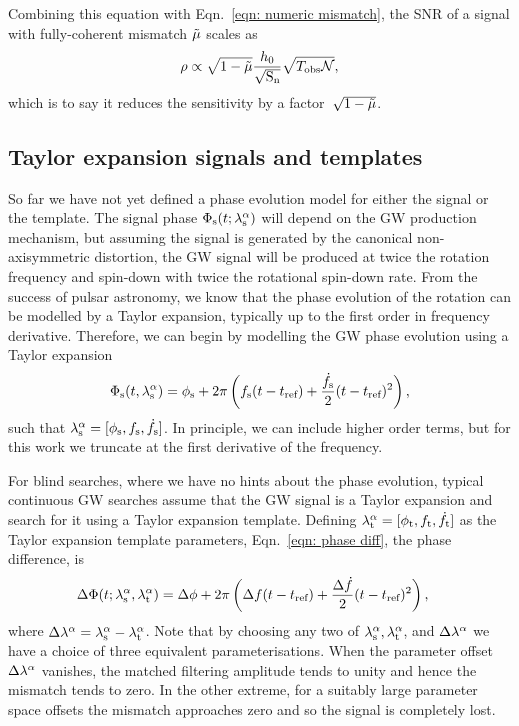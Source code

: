 \documentclass[../full_thesis/full_thesis.tex]{subfiles}
\begin{document}
Combining this equation with Eqn.~\eqref{eqn: numeric mismatch}, the SNR of a signal
with fully-coherent mismatch $\tilde{\mu}$ scales as
\begin{equation}
\rho \propto \sqrt{1-\tilde{\mu}} \frac{h_{0}}{\sqrt{\textrm{S}_{\textrm{n}}}}
                               \sqrt{T_{\mathrm{obs}} \mathcal{N}},
\end{equation}
which is to say it reduces the sensitivity by a factor~$\sqrt{1-\tilde{\mu}}$.



\subsection{Taylor expansion signals and templates}
So far we have not yet defined a phase evolution model for either the signal or the template.
The signal phase $\Phi_{\textrm{s}}(t; {\lambda}_\textrm{s}^{\alpha})$ will depend on the GW production mechanism,
but assuming the signal is generated by the canonical non-axisymmetric distortion,
the GW signal will be produced at twice the rotation frequency and spin-down
with twice the rotational spin-down rate. From the success of pulsar astronomy,
we know that the phase evolution of the rotation can be modelled by a Taylor
expansion, typically up to the first order in frequency derivative. Therefore,
we can begin by modelling the GW phase evolution using a Taylor expansion
\begin{equation}
\Phi_{\textrm{s}} (t, {\lambda}_\textrm{s}^{\alpha}) = \phi_{\textrm{s}} + 2\pi \left(f_{\textrm{s}} (t - t_{\textrm{ref}})
+ \frac{\dot{f}_{\textrm{s}}}{2}(t - t_{\textrm{ref}})^{2} \right),
\label{eqn: Taylor lambda signal}
\end{equation}
such that ${\lambda}_\textrm{s}^{\alpha} = [\phi_{\textrm{s}}, f_{\textrm{s}}, \dot{f}_{\textrm{s}}]$. In principle, we can include
higher order terms, but for this work we truncate at the first
derivative of the frequency.

For blind searches, where we have no hints about the phase evolution,
typical continuous GW searches assume that the GW signal is a Taylor expansion and
search for it using a Taylor expansion template. Defining ${\lambda}_\textrm{t}^{\alpha} = [\phi_{\textrm{t}},
{f_{\textrm{t}}}, \dot{f}_{\textrm{t}}]$ as the Taylor expansion
template parameters, Eqn.~\eqref{eqn: phase diff}, the phase difference, is
\begin{align}
\Delta \Phi(t; {\lambda}_\textrm{s}^{\alpha}, {\lambda}_\textrm{t}^{\alpha})  & =
\Delta\phi + 2\pi\left(\Delta f(t-t_{\textrm{ref}}) +
\frac{\Delta\dot{f}}{2}(t - t_{\textrm{ref}})^{2}\right),
\label{eqn: Delta Phi}
\end{align}
where $\Delta\lambda^{\alpha} = {\lambda}_\textrm{s}^{\alpha} - {\lambda}_\textrm{t}^{\alpha}$. Note that
by choosing any two of ${\lambda}_\textrm{s}^{\alpha}, {\lambda}_\textrm{t}^{\alpha}$, and $\Delta\lambda^{\alpha}$
we have a choice of three equivalent parameterisations.
When the parameter offset $\Delta\lambda^{\alpha}$ vanishes, the matched filtering
amplitude tends to unity and hence the mismatch tends to zero. In the other
extreme, for a suitably
large parameter space offsets the mismatch approaches zero and so the signal is
completely lost.
\end{document}
